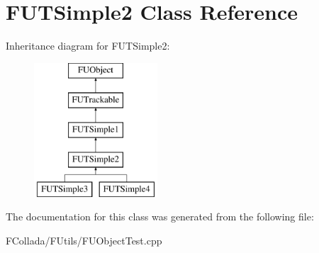 \hypertarget{classFUTSimple2}{
\section{FUTSimple2 Class Reference}
\label{classFUTSimple2}
}
Inheritance diagram for FUTSimple2:\begin{figure}[H]
\begin{center}
\leavevmode
\includegraphics[height=5.000000cm]{classFUTSimple2}
\end{center}
\end{figure}


The documentation for this class was generated from the following file:\begin{DoxyCompactItemize}
\item 
FCollada/FUtils/FUObjectTest.cpp\end{DoxyCompactItemize}

